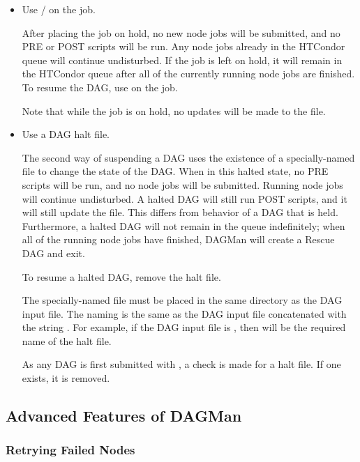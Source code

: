 \begin{itemize}
\item Use / on the  job.

After placing the  job on hold,
no new node jobs will be submitted,
and no PRE or POST scripts will be run.
Any node jobs already in the HTCondor queue will continue undisturbed.
If the  job is left on hold,
it will remain in the HTCondor queue after all of the currently running
node jobs are finished.
To resume the DAG, use  on the  job.

Note that while the  job is on hold,
no updates will be made to the  file.

\item Use a DAG halt file.

The second way of suspending a DAG uses the existence of a specially-named
file to change the state of the DAG.
When in this halted state,
no PRE scripts will be run, and no node jobs will be submitted.  
Running node jobs will continue undisturbed.
A halted DAG will still run POST scripts,
and it will still update the  file.
This differs from behavior of a DAG that is held.
Furthermore, a halted DAG will not remain in the queue indefinitely;
when all of the running node jobs have finished, 
DAGMan will create a Rescue DAG and exit.

To resume a halted DAG, remove the halt file.

The specially-named file must be placed in the same directory
as the DAG input file.
The naming is the same as the DAG input file concatenated with the
string .
For example, if the DAG input file is , 
then  will be the required name of the halt file.

As any DAG is first submitted with , 
a check is made for a halt file.
If one exists, it is removed.
\end{itemize}

\subsection{\label{sec:AdvDAGMan}Advanced Features of DAGMan}


\subsubsection{\label{dagman:retry}Retrying Failed Nodes}

